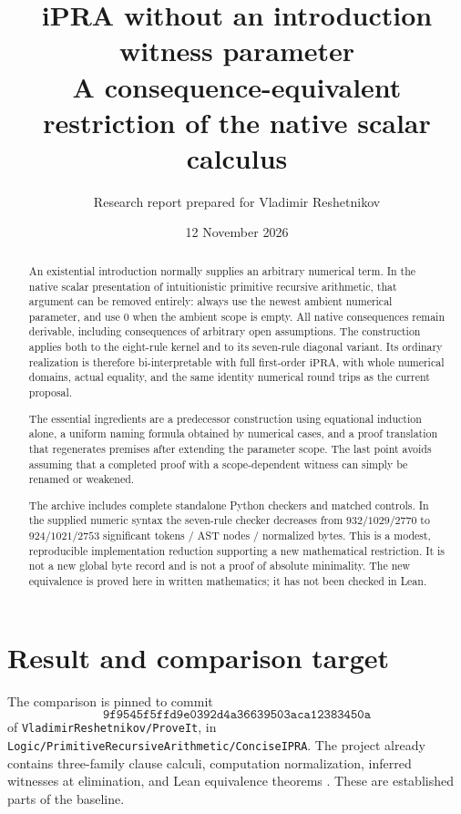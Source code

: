 \documentclass[11pt]{article}
\title{\textbf{iPRA without an introduction witness parameter}\\[5pt]
\large A consequence-equivalent restriction of the native scalar calculus}
\author{Research report prepared for Vladimir Reshetnikov}
\date{12 November 2026}
\newcommand{\ipra}{\mathrm{iPRA}}
\begin{document}
\maketitle

\begin{abstract}
An existential introduction normally supplies an arbitrary numerical term.
In the native scalar presentation of intuitionistic primitive recursive
arithmetic, that argument can be removed entirely: always use the newest
ambient numerical parameter, and use \(0\) when the ambient scope is empty.
All native consequences remain derivable, including consequences of arbitrary
open assumptions. The construction applies both to the eight-rule kernel
and to its seven-rule diagonal variant. Its ordinary realization is therefore
bi-interpretable with full first-order \(\ipra\), with whole numerical domains,
actual equality, and the same identity numerical round trips as the current
proposal.

The essential ingredients are a predecessor construction using equational
induction alone, a uniform naming formula obtained by numerical cases, and a
proof translation that regenerates premises after extending the parameter
scope. The last point avoids assuming that a completed proof with a
scope-dependent witness can simply be renamed or weakened.

The archive includes complete standalone Python checkers and matched controls.
In the supplied numeric syntax the seven-rule checker decreases from
\(932/1029/2770\) to \(924/1021/2753\) significant tokens / AST nodes /
normalized bytes. This is a modest, reproducible implementation reduction
supporting a new mathematical restriction. It is not a new global byte
record and is not a proof of absolute minimality. The new equivalence is
proved here in written mathematics; it has not been checked in Lean.
\end{abstract}

\section{Result and comparison target}

The comparison is pinned to commit
\[
\texttt{9f9545f5ffd9e0392d4a36639503aca12383450a}
\]
of \texttt{VladimirReshetnikov/ProveIt}, in
\texttt{Logic/PrimitiveRecursiveArithmetic/ConciseIPRA}.
The project already contains three-family clause calculi, computation
normalization, inferred witnesses at elimination, and Lean equivalence
theorems \cite{repo,diag,bridge}. These are established parts of the baseline.
\end{document}
